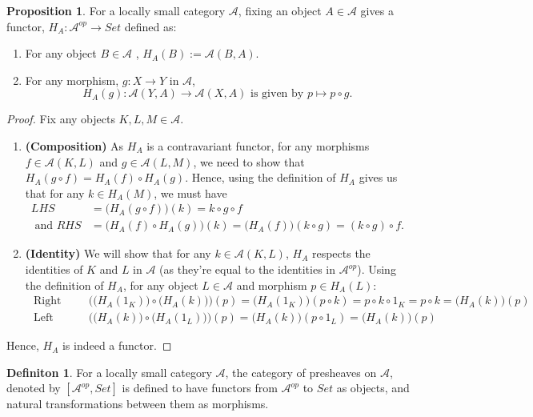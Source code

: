 \documentclass[18pt,a4paper]{article}
\theoremstyle{definition}
\newtheorem{definition}[theorem]{Definiton}
\newtheorem{proop}[theorem]{Proposition}
\begin{document}
\begin{proop} %
	For a locally small category $\mathcal{A}$, fixing an object $A \in \mathcal{A} $ gives
	a functor, $H_A: \mathcal{A} ^{op} \rightarrow Set$ defined as:
	\begin{enumerate}[label=(\roman*)]
		\item For any object $B \in \mathcal{A} $ , $H_A(B):=\mathcal{A} (B,A)$.
		\item For any morphism, $g : X \rightarrow Y $ in $\mathcal{A}$,
			\[H_A(g): \mathcal{A} (Y,A) \rightarrow \mathcal{A}(X,A)
			\text{ is given by } p \mapsto p \circ g.\]
	\end{enumerate}
\end{proop}
\begin{proof}\setcounter{equation}{0}
	Fix any objects $K,L,M \in \mathcal{A} $.
	\begin{enumerate}[label=\Roman*]
		\item \textbf{ (Composition) } As $H_A$ is a contravariant functor, for
			any morphisms $f\in \mathcal{A} (K,L)$ and $g \in
			\mathcal{A}(L,M)$, we need to show that
			$H_A(g \circ f)=H_A(f) \circ H_A(g)$.
			Hence, using the definition of $H_A$ gives us that for any $k \in H_A(M) $, we must have
			\begin{align*}
				LHS&=\Big( H_A(g \circ f) \Big) (k)=k\circ g\circ f \\
				\text{ and } RHS&=\Big( H_A(f)\circ H_A(g) \Big) (k)=\Big( H_A(f) \Big) (k \circ g)
			=(k\circ g)\circ f. \end{align*}
		\item \textbf{ (Identity) } We will show that for any $k \in \mathcal{A} (K,L)$, $H_A$ respects the identities
			of $K$ and $L$ in $\mathcal{A}$ (as they're equal to the identities in $\mathcal{A} ^{op}$). Using the definition of $H_A$, for any object $L\in \mathcal{A} $ and
			morphism $p \in H_A(L)$:
			\begin{align*}
				\text{ Right Identity: }& \Big( \big( H_A(1_K) \big) \circ \big( H_A(k) \big) \Big)(p)
				=\big( H_A(1_K) \big) (p \circ k) = p \circ k \circ 1_K=p \circ k = \big( H_A(k) \big)(p)\\
				\text{ Left Identity: }& \Big( \big( H_A(k) \big) \circ \big( H_A(1_L) \big) \Big)(p)
				=\big( H_A(k) \big) (p \circ 1_L) = \big( H_A(k) \big) (p)
			\end{align*}

		\end{enumerate}
		Hence, $H_A$ is indeed a functor.
	\end{proof}
	\begin{definition} %
		For a locally small category $\mathcal{A} $, the category of presheaves on $\mathcal{A} $, denoted by $[\mathcal{A} ^{op},Set]$
		is defined to have functors from $\mathcal{A} ^{op}$ to $Set$ as objects,
		and natural transformations between them as morphisms.
	\end{definition}
\end{document}

